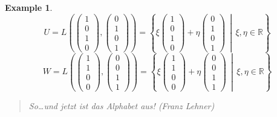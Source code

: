 \documentclass[a4paper,landscape,twocolumn]{article}
\newcommand\setdef[2]{\left\{#1\,\middle|\,#2\right\}}
\newtheorem{ex}{Example}
\begin{document}
\begin{ex}
  \[ U = L\left(\begin{pmatrix} 1 \\ 0 \\ 1 \\ 0 \end{pmatrix}, \begin{pmatrix} 0 \\ 1 \\ 0 \\ 1 \end{pmatrix}\right) = \setdef{\xi \begin{pmatrix} 1 \\ 0 \\ 1 \\ 0 \end{pmatrix} + \eta \begin{pmatrix} 0 \\ 1 \\ 0 \\ 1 \end{pmatrix}}{\xi, \eta \in \mathbb R} \]
  \[ W = L\left(\begin{pmatrix} 1 \\ 1 \\ 0 \\ 0 \end{pmatrix}, \begin{pmatrix} 0 \\ 0 \\ 1 \\ 1 \end{pmatrix}\right) = \setdef{\xi \begin{pmatrix} 1 \\ 1 \\ 0 \\ 0 \end{pmatrix} + \eta \begin{pmatrix} 0 \\ 0 \\ 1 \\ 1 \end{pmatrix}}{\xi, \eta \in \mathbb R} \]

  \begin{quote}
    \foreignlanguage{ngerman}{So\dots und jetzt ist das Alphabet aus! (Franz Lehner)}
  \end{quote}


\end{ex}
\end{document}
